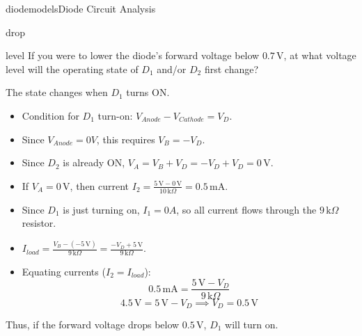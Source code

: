 \begin{mainquestion}{diodemodels}{Diode Circuit Analysis}
\begin{partquestion}{drop}
\end{partquestion}

\begin{partquestion}{level}
{If you were to lower the diode's forward voltage below $0.7\,\text{V}$, at what voltage level will the operating state of $D_1$ and/or $D_2$ first change?}

\begin{answer}
        The state changes when $D_1$ turns ON.
        \begin{itemize}
            \item Condition for $D_1$ turn-on: $V_{Anode} - V_{Cathode} = V_D$.
            \item Since $V_{Anode} = 0V$, this requires $V_B = -V_D$.
            \item Since $D_2$ is already ON, $V_A = V_B + V_D = -V_D + V_D = 0\,\text{V}$.
            \item If $V_A = 0\,\text{V}$, then current $I_2 = \frac{5\,\text{V} - 0\,\text{V}}{10\,\text{k}\Omega} = 0.5\,\text{mA}$.
            \item Since $D_1$ is just turning on, $I_1 = 0A$, so all current flows through the $9\,\text{k}\Omega$ resistor.
            \item $I_{load} = \frac{V_B - (-5\,\text{V})}{9\,\text{k}\Omega} = \frac{-V_D + 5\,\text{V}}{9\,\text{k}\Omega}$.
            \item Equating currents ($I_2 = I_{load}$):
            \[ 0.5\,\text{mA} = \frac{5\,\text{V} - V_D}{9\,\text{k}\Omega} \]
            \[ 4.5\,\text{V} = 5\,\text{V} - V_D \implies V_D = 0.5\,\text{V} \]
        \end{itemize}
        Thus, if the forward voltage drops below $0.5\,\text{V}$, $D_1$ will turn on.
\end{answer}

\end{partquestion}
\end{mainquestion}
